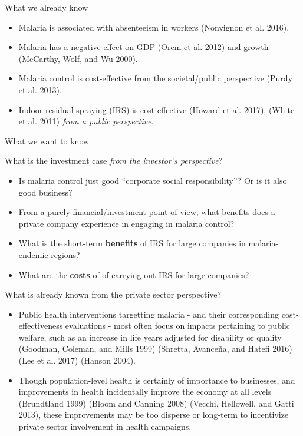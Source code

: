 \documentclass[ignorenonframetext,]{beamer}
\providecommand{\tightlist}{%
  \setlength{\itemsep}{0pt}\setlength{\parskip}{0pt}}
\begin{document}
\begin{frame}{What we already know}

\begin{itemize}
\tightlist
\item
  Malaria is associated with absenteeism in workers (Nonvignon et al.
  2016).
\item
  Malaria has a negative effect on GDP (Orem et al. 2012) and growth
  (McCarthy, Wolf, and Wu 2000).
\item
  Malaria control is cost-effective from the societal/public perspective
  (Purdy et al. 2013).
\item
  Indoor residual spraying (IRS) is cost-effective (Howard et al. 2017),
  (White et al. 2011) \emph{from a public perspective}.
\end{itemize}

\end{frame}

\begin{frame}{What we want to know}

What is the investment case \emph{from the investor's perspective}?

\begin{itemize}
\tightlist
\item
  Is malaria control just good ``corporate social responsibility''? Or
  is it also good business?
\item
  From a purely financial/investment point-of-view, what benefits does a
  private company experience in engaging in malaria control?\\
\item
  What is the short-term \textbf{benefits} of IRS for large companies in
  malaria-endemic regions?
\item
  What are the \textbf{costs} of of carrying out IRS for large
  companies?
\end{itemize}

\end{frame}

\begin{frame}{What is already known from the private sector
perspective?}

\begin{itemize}
\tightlist
\item
  Public health interventions targetting malaria - and their
  corresponding cost-effectiveness evaluations - most often focus on
  impacts pertaining to public welfare, such as an increase in life
  years adjusted for disability or quality (Goodman, Coleman, and Mills
  1999) (Shretta, Avanceña, and Hatefi 2016) (Lee et al. 2017) (Hanson
  2004).\\
\item
  Though population-level health is certainly of importance to
  businesses, and improvements in health incidentally improve the
  economy at all levels (Brundtland 1999) (Bloom and Canning 2008)
  (Vecchi, Hellowell, and Gatti 2013), these improvements may be too
  disperse or long-term to incentivize private sector involvement in
  health campaigns.
\end{itemize}

\end{frame}
\end{document}
